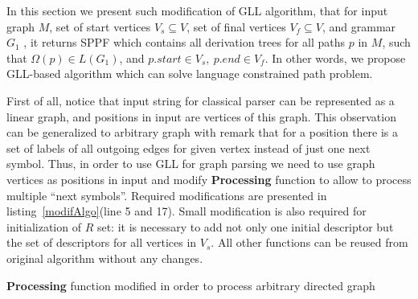 In this section we present such modification of GLL algorithm, that for input graph $M$, set of start vertices $V_s\subseteq V$, set of final vertices $V_f\subseteq V$, and grammar $G_1$
, it returns SPPF which contains all derivation trees for all paths $p$ in $M$, such that $\Omega(p) \in L(G_1)$, and $p.start \in V_s,\ p.end \in V_f$.
In other words, we propose GLL-based algorithm which can solve language constrained path problem.

First of all, notice that input string for classical parser can be represented as a linear graph, and positions in input are vertices of this graph.
This observation can be generalized to arbitrary graph with remark that for a position there is a set of labels of all outgoing edges for given vertex instead of just one next symbol. 
Thus, in order to use GLL for graph parsing we need to use graph vertices as positions in input and modify \textbf{Processing} function to allow to process multiple ``next symbols''.
Required modifications are presented in listing~\ref{modifAlgo}(line 5 and 17).
Small modification is also required for initialization of $R$ set: it is necessary to add not only one initial descriptor but the set of descriptors for all vertices in $V_s$.
All other functions can be reused from original algorithm without any changes.

\begin{algorithm}[h]
\begin{algorithmic}[1]
\caption{\textbf{Processing} function modified in order to process arbitrary directed graph}
\label{modifAlgo}
       \Else 
       \EndIf
       \EndIf
       \EndFor
  \EndCase
       \EndFor
  \EndCase
  \EndCase
  \Case{$\_$}
  \EndCase
  \EndSwitch
\EndFunction

\end{algorithmic}
\end{algorithm}

